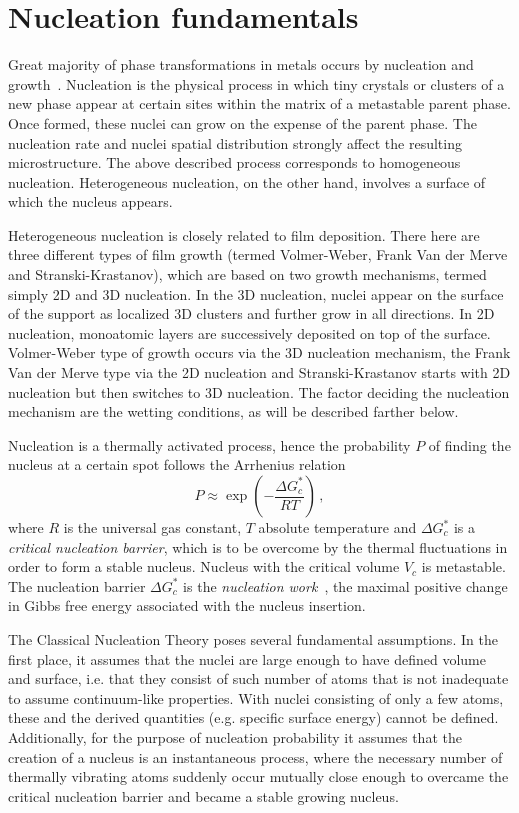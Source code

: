 \section{Nucleation fundamentals}
Great majority of phase transformations in metals occurs by nucleation and growth~\cite{Porter2009}. Nucleation is the physical process in which tiny crystals or clusters of a new phase appear at certain sites within the matrix of a metastable parent phase. Once formed, these nuclei can grow on the expense of the parent phase. The nucleation rate and nuclei spatial distribution strongly affect the resulting microstructure. The above described process corresponds to homogeneous nucleation. Heterogeneous nucleation, on the other hand, involves a surface of which the nucleus appears. 

Heterogeneous nucleation is closely related to film deposition. There here are three different types of film growth (termed Volmer-Weber, Frank Van der Merve and Stranski-Krastanov), which are based on two growth mechanisms, termed simply 2D and 3D nucleation. In the 3D nucleation, nuclei appear on the surface of the support as localized 3D clusters and further grow in all directions. In 2D nucleation, monoatomic layers are successively deposited on top of the surface. Volmer-Weber type of growth occurs via the 3D nucleation mechanism, the Frank Van der Merve type via the 2D nucleation and Stranski-Krastanov starts with 2D nucleation but then switches to 3D nucleation. The factor deciding the nucleation mechanism  are the wetting conditions, as will be described farther below. 

Nucleation is a thermally activated process, hence the probability $P$ of finding the nucleus at a certain spot follows the Arrhenius relation
\begin{equation}
	P \approx \exp\left(-\frac{\Delta G_c^*}{RT}\right) \,,
\end{equation}
where $R$ is the universal gas constant, $T$ absolute temperature and $\Delta G_c^*$ is a \textit{critical nucleation barrier}, which is to be overcome by the thermal fluctuations in order to form a stable nucleus. Nucleus with the critical volume $V_c$ is metastable. The nucleation barrier $\Delta G_c^*$ is the \textit{nucleation work}~\cite{Milchev2002}, the maximal positive change in Gibbs free energy associated with the nucleus insertion.

The Classical Nucleation Theory poses several fundamental assumptions. In the first place, it assumes that the nuclei are large enough to have defined volume and surface, i.e. that they consist of such number of atoms that is not inadequate to assume continuum-like properties. With nuclei consisting of only a few atoms, these and the derived quantities (e.g. specific surface energy) cannot be defined. Additionally, for the purpose of nucleation probability it assumes that the creation of a nucleus is an instantaneous process, where the necessary number of thermally vibrating atoms suddenly occur mutually close enough to overcame the critical nucleation barrier and became a stable growing nucleus. 

